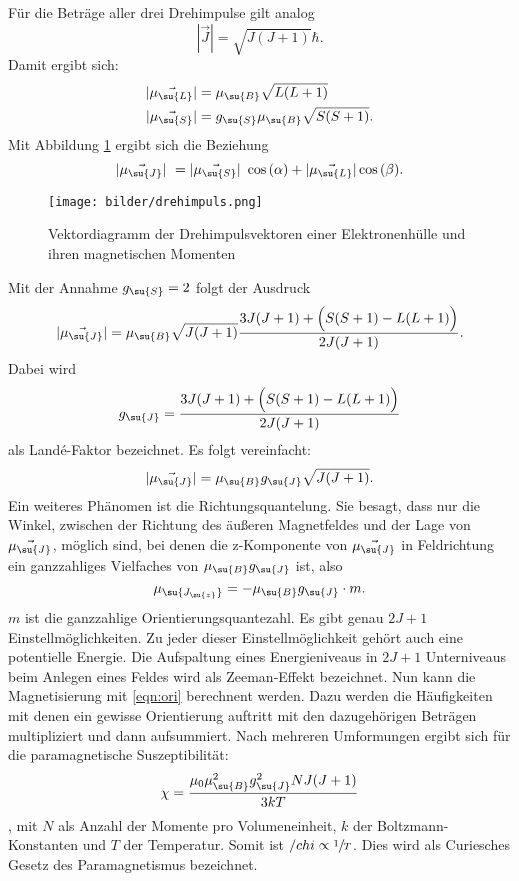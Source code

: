 Für die Beträge aller drei Drehimpulse gilt analog
\begin{equation}
  |\vec{J}| = \sqrt{J(J+1)} \hbar.
\end{equation}
Damit ergibt sich:
\begin{align}
  |\vec{\mu_\su{L}}| &= \mu_\su{B}\sqrt{L(L+1)} \\
  |\vec{\mu_\su{S}}| &= g_\su{S}\mu_\su{B}\sqrt{S(S+1)}.
\end{align}
Mit Abbildung \ref{fig:drehimpuls} ergibt sich die Beziehung
\begin{equation}
  |\vec{\mu_\su{J}}| = |\vec{\mu_\su{S}}| \cos{(\alpha)} + |\vec{\mu_\su{L}}|
  \cos{(\beta)}.
\end{equation}
\begin{figure}
  \centering
  \texttt{[image: bilder/drehimpuls.png]}
  \caption{Vektordiagramm der Drehimpulsvektoren einer Elektronenhülle und ihren
  magnetischen Momenten \cite{606}}
  \label{fig:drehimpuls}
\end{figure}
Mit der Annahme $g_\su{S} = 2$ folgt der Ausdruck
\begin{equation}
  |\vec{\mu_\su{J}}| = \mu_\su{B} \sqrt{J(J+1)} \frac{3J(J+1)+\Big(S(S+1)
  -L(L+1)\Big)}{2J(J+1)}.
\end{equation}
Dabei wird
\begin{equation}
  g_\su{J} = \frac{3J(J+1)+\Big(S(S+1) -L(L+1)\Big)}{2J(J+1)}
\end{equation}
als Landé-Faktor bezeichnet.
Es folgt vereinfacht:
\begin{equation}
  |\vec{\mu_\su{J}}| = \mu_\su{B} g_\su{J} \sqrt{J(J+1)}.
\end{equation}
Ein weiteres Phänomen ist die Richtungsquantelung. Sie besagt, dass nur die Winkel,
zwischen der Richtung des äußeren Magnetfeldes und der Lage von $\vec{\mu_\su{J}}$,
möglich sind, bei denen die z-Komponente von $\vec{\mu_\su{J}}$ in Feldrichtung
ein ganzzahliges Vielfaches von $\mu_\su{B}g_\su{J}$ ist, also
\begin{equation}
  \mu_\su{J_\su{z}} = -\mu_\su{B}g_\su{J}\cdot m. \label{eqn:ori}
\end{equation}
$m$ ist die ganzzahlige Orientierungsquantezahl. Es gibt genau $2J+1$
Einstellmöglichkeiten. Zu jeder dieser Einstellmöglichkeit gehört auch eine
potentielle Energie. Die Aufspaltung eines Energieniveaus in $2J+1$ Unterniveaus
beim Anlegen eines Feldes wird als Zeeman-Effekt bezeichnet.
Nun kann die Magnetisierung mit \eqref{eqn:ori} berechnent werden. Dazu werden
die Häufigkeiten mit denen ein gewisse Orientierung auftritt mit den dazugehörigen
Beträgen multipliziert und dann aufsummiert. Nach mehreren Umformungen ergibt
sich für die paramagnetische Suszeptibilität:
\begin{equation}
  \chi = \frac{\mu_0 \mu_\su{B}^2 g_\su{J}^2 N J(J+1)}{3kT}
\end{equation}
, mit $N$ als Anzahl der Momente pro Volumeneinheit, $k$ der Boltzmann-Konstanten
 und $T$ der Temperatur. Somit ist $/chi \propto \sfrac{1}{T}$. Dies wird als Curiesches
 Gesetz des Paramagnetismus bezeichnet.

